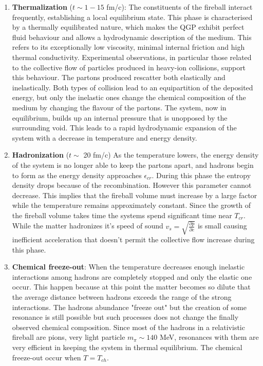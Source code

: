 \documentclass[12pt,a4paper]{book}
\begin{document}
\begin{enumerate}
		\item  \textbf{Thermalization} ($t \sim 1 - 15$ fm/c): The constituents of the fireball interact frequently, establishing a local equilibrium state. This phase is characterised by a thermally equilibrated nature, which makes the QGP exhibit perfect fluid behaviour and allows a hydrodynamic description of the medium.  This refers to its exceptionally low viscosity, minimal internal friction and high thermal conductivity. Experimental observations, in particular those related to the collective flow of particles produced in heavy-ion collisions, support this behaviour. The partons produced rescatter both elastically and inelastically. Both types of collision lead to an equipartition of the deposited energy, but only the inelastic ones change the chemical composition of the medium by changing the flavour of the partons. The system, now in equilibrium, builds up an internal pressure that is unopposed by the surrounding void. This leads to a rapid hydrodynamic expansion of the system with a decrease in temperature and energy density.
		
		\item \textbf{Hadronization} ($t \sim$ 20 fm/c) As the temperature lowers, the energy density of the system is no longer able to keep the partons apart, and hadrons begin to form as the energy density approaches $\epsilon_{cr}$. During this phase the entropy density drops because of the recombination. However this parameter cannot decrease. This implies that the fireball volume must increase by a large factor while the temperature remains approximately constant. Since the growth of the fireball volume takes time the systems spend significant time near $T_{cr}$. While the matter hadronizes it's speed of sound $v_s=\sqrt{\frac{\partial p}{\partial e}}$ is small causing inefficient acceleration that doesn't permit the collective flow increase during this phase.
		
		\item \textbf{Chemical freeze-out}: When the temperature decreases enough inelastic interactions among hadrons are completely stopped and only the elastic one occur. This happen because at this point the matter becomes so dilute that the average distance between hadrons exceeds the range of the strong interactions. The hadrons abundance "freeze out" but the creation of some resonance is still possible but such processes does not change the finally observed chemical composition. Since most of the hadrons in a relativistic fireball are pions, very light particle $m_\pi \sim 140$ MeV, resonances with them are very efficient in keeping the system in thermal equilibrium. The chemical freeze-out occur when $T= T_{ch}$.
		

\end{enumerate}
\end{document}
